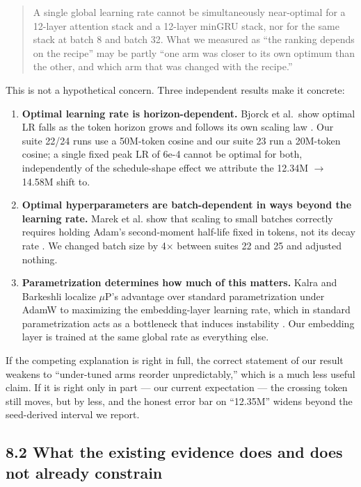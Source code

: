 \begin{quote}
A single global learning rate cannot be simultaneously near-optimal for a 12-layer attention
stack and a 12-layer minGRU stack, nor for the same stack at batch 8 and batch 32. What we
measured as ``the ranking depends on the recipe'' may be partly ``one arm was closer to its own
optimum than the other, and which arm that was changed with the recipe.''
\end{quote}

This is not a hypothetical concern. Three independent results make it concrete:

\begin{enumerate}
\def\labelenumi{\arabic{enumi}.}
\tightlist
\item
  \textbf{Optimal learning rate is horizon-dependent.} Bjorck et al.~show optimal LR falls as the token
  horizon grows and follows its own scaling law \cite{ref31}. Our suite 22/24 runs use a 50M-token cosine
  and our suite 23 run a 20M-token cosine; a single fixed peak LR of 6e-4 cannot be optimal for
  both, independently of the schedule-shape effect we attribute the 12.34M $\rightarrow$ 14.58M shift to.
\item
  \textbf{Optimal hyperparameters are batch-dependent in ways beyond the learning rate.} Marek et al.
  show that scaling to small batches correctly requires holding Adam's second-moment half-life
  fixed in tokens, not its decay rate \cite{ref30}. We changed batch size by 4$\times$ between suites 22 and 25
  and adjusted nothing.
\item
  \textbf{Parametrization determines how much of this matters.} Kalra and Barkeshli localize $\mu$P's
  advantage over standard parametrization under AdamW to maximizing the embedding-layer learning
  rate, which in standard parametrization acts as a bottleneck that induces instability \cite{ref35}. Our
  embedding layer is trained at the same global rate as everything else.
\end{enumerate}

If the competing explanation is right in full, the correct statement of our result weakens to
``under-tuned arms reorder unpredictably,'' which is a much less useful claim. If it is right only
in part --- our current expectation --- the crossing token still moves, but by less, and the honest
error bar on ``12.35M'' widens beyond the seed-derived interval we report.

\subsection{8.2 What the existing evidence does and does not already constrain}\label{what-the-existing-evidence-does-and-does-not-already-constrain}

